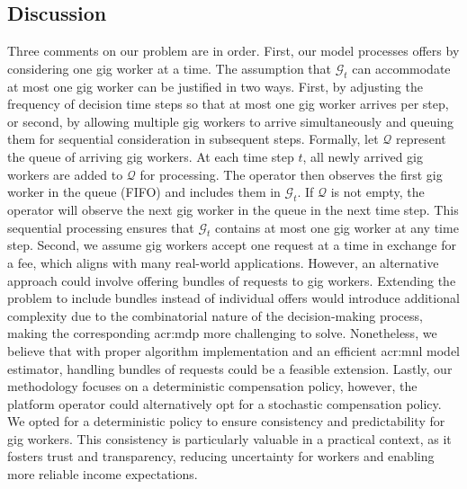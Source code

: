 \subsection{Discussion}

Three comments on our problem are in order. First, our model processes offers by considering one gig worker at a time. The assumption that $\mathcal{G}_t$ can accommodate at most one gig worker can be justified in two ways. First, by adjusting the frequency of decision time steps so that at most one gig worker arrives per step, or second, by allowing multiple gig workers to arrive simultaneously and queuing them for sequential consideration in subsequent steps. Formally, let $\mathcal{Q}$ represent the queue of arriving gig workers. At each time step $t$, all newly arrived gig workers are added to $\mathcal{Q}$ for processing. The operator then observes the first gig worker in the queue (FIFO) and includes them in $\mathcal{G}_t$. If $\mathcal{Q}$ is not empty, the operator will observe the next gig worker in the queue in the next time step. This sequential processing ensures that $\mathcal{G}_t$ contains at most one gig worker at any time step.
Second, we assume gig workers accept one request at a time in exchange for a fee, which aligns with many real-world applications. However, an alternative approach could involve offering bundles of requests to gig workers. Extending the problem to include bundles instead of individual offers would introduce additional complexity due to the combinatorial nature of the decision-making process, making the corresponding \gls{acr:mdp} more challenging to solve. Nonetheless, we believe that with proper algorithm implementation and an efficient \gls{acr:mnl} model estimator, handling bundles of requests could be a feasible extension.
Lastly, our methodology focuses on a deterministic compensation policy, however, the platform operator could alternatively opt for a stochastic compensation policy. We opted for a deterministic policy to ensure consistency and predictability for gig workers. This consistency is particularly valuable in a practical context, as it fosters trust and transparency, reducing uncertainty for workers and enabling more reliable income expectations.

